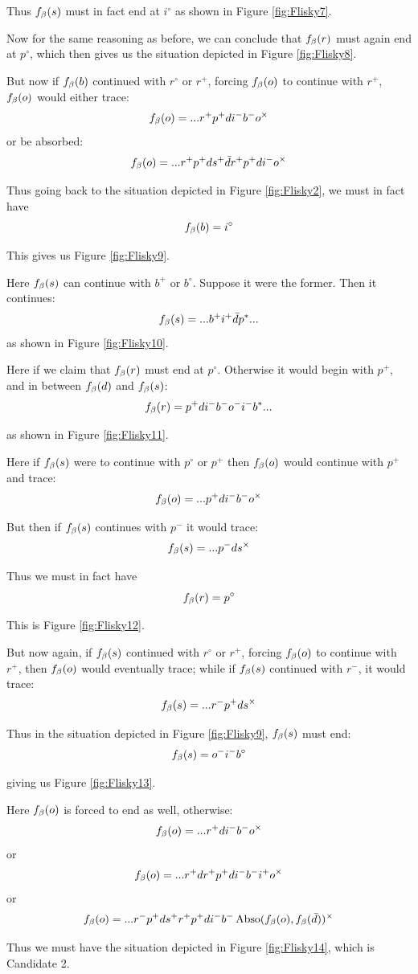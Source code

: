 Thus $f_\beta(s)$ must in fact end at $i^\circ$ as shown in Figure \ref{fig:Flisky7}.

Now for the same reasoning as before, we can conclude that $f_\beta(r)$ must again end at $p^\circ$, which then gives us the situation depicted in Figure \ref{fig:Flisky8}.

But now if $f_\beta(b)$ continued with $r^\circ$ or $r^+$, forcing $f_\beta(o)$ to continue with $r^+$, $f_\beta(o)$ would either trace:
\[
f_\beta(o) = ...r^+ p^+ d i^- b^- o^\times
\]
or be absorbed:
\[
f_\beta(o) = ...r^+ p^+ d s^+ \bar{d} r^+ p^+ d i^- o^\times
\]

Thus going back to the situation depicted in Figure \ref{fig:Flisky2}, we must in fact have
\[
f_\beta(b) = i^\circ
\]

This gives us Figure \ref{fig:Flisky9}.

Here $f_\beta(s)$ can continue with $b^+$ or $b^\circ$. Suppose it were the former. Then it continues:
\[
f_\beta(s) = ...b^+ i^+ \bar{d} p^*...
\]
as shown in Figure \ref{fig:Flisky10}.

Here if we claim that $f_\beta(r)$ must end at $p^\circ$. Otherwise it would begin with $p^+$, and in between $f_\beta(d)$ and $f_\beta(s)$:
\[
f_\beta(r) = p^+ d i^- b^- o^- i^- b^*...
\]

as shown in Figure \ref{fig:Flisky11}.

Here if $f_\beta(s)$ were to continue with $p^\circ$ or $p^+$ then $f_\beta(o)$ would continue with $p^+$ and trace:
\[
f_\beta(o) = ...p^+ d i^- b^- o^\times
\]

But then if $f_\beta(s)$ continues with $p^-$ it would trace:
\[
f_\beta(s) = ...p^- d s^\times
\]

Thus we must in fact have
\[
f_\beta(r) = p^\circ
\]

This is Figure \ref{fig:Flisky12}.

But now again, if $f_\beta(s)$ continued with $r^\circ$ or $r^+$, forcing $f_\beta(o)$ to continue with $r^+$, then $f_\beta(o)$ would eventually trace; while if $f_\beta(s)$ continued with $r^-$, it would trace:
\[
f_\beta(s) = ...r^- p^+ d s^\times
\]

Thus in the situation depicted in Figure \ref{fig:Flisky9}, $f_\beta(s)$ must end:
\[
f_\beta(s) = o^- i^- b^\circ
\]

giving us Figure \ref{fig:Flisky13}.

Here $f_\beta(o)$ is forced to end as well, otherwise:
\[
f_\beta(o) = ...r^+ d i^- b^- o^\times
\]
or
\[
f_\beta(o) = ...r^+ d r^+ p^+ d i^-b^- i^+ o^\times
\]
or
\[
f_\beta(o) = ...r^- p^+ d s^+ r^+ p^+ d i^- b^- \operatorname{Abso}(f_\beta(o), f_\beta(\bar{d}))^\times
\]

Thus we must have the situation depicted in Figure \ref{fig:Flisky14}, which is Candidate 2.

